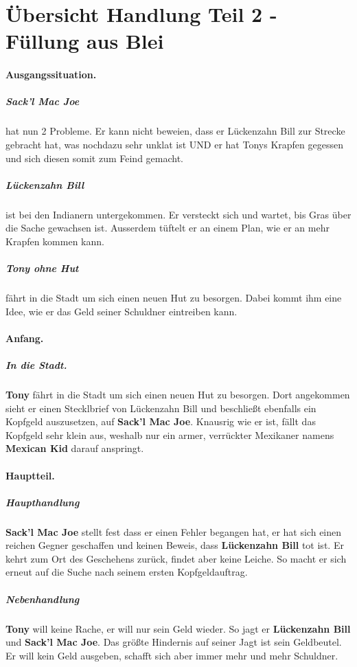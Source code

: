 \documentclass[12pt,a4paper,german]{book}
\begin{document}
%
\section{Übersicht Handlung Teil 2 - Füllung aus Blei}

\paragraph{Ausgangssituation.}
    \subparagraph{Sack'l Mac Joe} hat nun 2 Probleme.
    Er kann nicht beweien, dass er Lückenzahn Bill zur Strecke gebracht hat, was nochdazu sehr unklat ist UND er hat Tonys Krapfen gegessen und sich diesen somit zum Feind gemacht.
    \subparagraph{Lückenzahn Bill} ist bei den Indianern untergekommen.
    Er versteckt sich und wartet, bis Gras über die Sache gewachsen ist. Ausserdem tüftelt er an einem Plan, wie er an mehr Krapfen kommen kann.
    \subparagraph{Tony ohne Hut} fährt in die Stadt um sich einen neuen Hut zu besorgen.
    Dabei kommt ihm eine Idee, wie er das Geld seiner Schuldner eintreiben kann.

\paragraph{Anfang.}
    \subparagraph{In die Stadt.}
    \textbf{Tony} fährt in die Stadt um sich einen neuen Hut zu besorgen. Dort angekommen sieht er einen Stecklbrief von Lückenzahn Bill und beschließt ebenfalls ein Kopfgeld auszusetzen, auf \textbf{Sack'l Mac Joe}. Knausrig wie er ist, fällt das Kopfgeld sehr klein aus, weshalb nur ein armer, verrückter Mexikaner namens \textbf{Mexican Kid} darauf anspringt.

\paragraph{Hauptteil.}
   
\subparagraph{Haupthandlung}
    \textbf{Sack'l Mac Joe} stellt fest dass er einen Fehler begangen hat, er hat sich einen reichen Gegner geschaffen und keinen Beweis, dass \textbf{Lückenzahn Bill} tot ist. Er kehrt zum Ort des Geschehens zurück, findet aber keine Leiche. So macht er sich erneut auf die Suche nach seinem ersten Kopfgeldauftrag.
\subparagraph{Nebenhandlung}
    \textbf{Tony} will keine Rache, er will nur sein Geld wieder. So jagt er \textbf{Lückenzahn Bill} und \textbf{Sack'l Mac Joe}. Das größte Hindernis auf seiner Jagt ist sein Geldbeutel. Er will kein Geld ausgeben, schafft sich aber immer mehr und mehr Schuldner.
\end{document}
